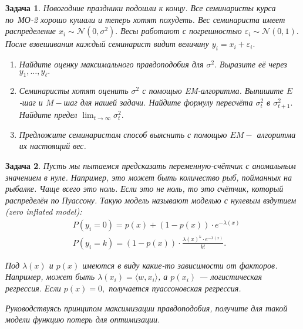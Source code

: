 \documentclass[12pt,fleqn]{article}
\newtheorem{esProblem}{Задача}
\begin{document}
\begin{esProblem}
    Новогодние праздники подошли к концу. Все семинаристы курса по~МО-2 хорошо кушали и теперь хотят похудеть. Вес семинариста имеет распределение $x_i \sim \mathcal{N}(0, \sigma^2).$ Весы работают с погрешностью $\varepsilon_i \sim \mathcal{N}(0,1).$ После взвешивания каждый семинарист видит величину  $y_i = x_i + \varepsilon_i.$ 
    \begin{enumerate} 
        \item[а)] Найдите оценку максимального правдоподобия для $\sigma^2.$ Выразите её через $y_1, \ldots, y_{\ell}.$
        
        \item[б)] Семинаристы хотят оценить $\sigma^2$ с помощью EM-алгоритма. Выпишите $E$-шаг и $M-$шаг для нашей задачи. Найдите формулу пересчёта $\sigma^2_t$ в $\sigma^2_{t+1}.$ Найдите предел $\lim_{t \to \infty} \sigma^2_t.$
        
        \item[в)] Предложите семинаристам способ выяснить с помощью $EM-$ алгоритма их настоящий вес. 
    \end{enumerate}
\end{esProblem}

\begin{esProblem}
    Пусть мы пытаемся предсказать переменную-счётчик с аномальным значением в нуле. Например, это может быть количество рыб, пойманных на рыбалке. Чаще всего это ноль. Если это не ноль, то это счётчик, который распределён по Пуассону. Такую модель называют \textit{моделью с нулевым вздутием (zero inflated model)}:
    \begin{equation*}
        \begin{aligned}
            & P(y_i = 0) = p(x) + (1 - p(x))\cdot e^{-\lambda(x)}\\
            & P(y_i = k) = (1 - p(x))\cdot \frac{\lambda(x)^k \cdot e^{-\lambda(x)}}{k!}.
        \end{aligned}
    \end{equation*}
    
    Под $\lambda(x)$ и $p(x)$ имеются в виду какие-то зависимости от факторов. Например, может быть $\lambda(x_i) = \langle w, x_i \rangle$, а $p(x_i)$ --- логистическая регрессия. Если $p(x) = 0,$ получается пуассоновская регрессия. 
    
    Руководствуясь принципом максимизации правдоподобия, получите для такой модели функцию потерь для оптимизации.
\end{esProblem}
\end{document}
